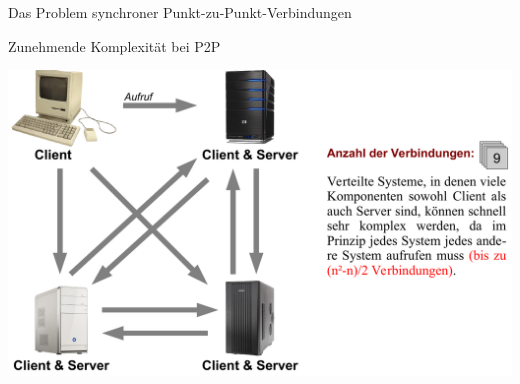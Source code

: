 \begin{frame}[fragile]{Das Problem synchroner Punkt-zu-Punkt-Verbindungen}
\end{frame}

\begin{frame}{Zunehmende Komplexität bei P2P}
    \begin{center}
        \includegraphics[width=\linewidth]{06-architektur/img/mqtt4}
    \end{center}
\end{frame}

